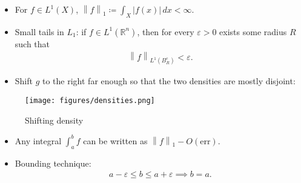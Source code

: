 \begin{concept}

\envlist

\begin{itemize}
\item
  For \(f\in L^1(X)\),
  \({\left\lVert {f} \right\rVert}_1 \coloneqq\int_X {\left\lvert {f(x)} \right\rvert} \,dx< \infty\).
\item
  Small tails in \(L_1\): if \(f\in L^1({\mathbb{R}}^n)\), then for
  every \({\varepsilon}>0\) exists some radius \(R\) such that
  \begin{align*}
  {\left\lVert {f} \right\rVert}_{L^1(B_R^c)} < {\varepsilon}
  .\end{align*}
\item
  Shift \(g\) to the right far enough so that the two densities are
  mostly disjoint:
\end{itemize}

\begin{figure}
\centering
\texttt{[image: figures/densities.png]}
\caption{Shifting density}
\end{figure}

\begin{itemize}
\item
  Any integral \(\int_a^b f\) can be written as
  \({\left\lVert {f} \right\rVert}_1 - O(\text{err})\).
\item
  Bounding technique:
  \begin{align*}
  a-{\varepsilon}\leq b \leq a+{\varepsilon}\implies b=a
  .\end{align*}
\end{itemize}

\end{concept}

